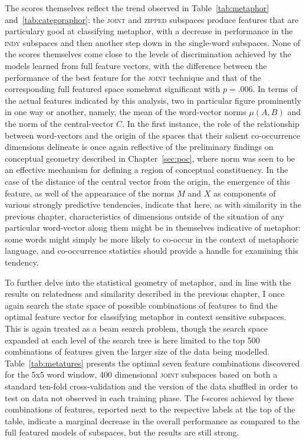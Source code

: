 The scores themselves reflect the trend observed in Table~\ref{tab:metaphor} and~\ref{tab:categoraphor}: the \textsc{joint} and \textsc{zipped} subspaces produce features that are particulary good at classifying metaphor, with a decrease in performance in the \textsc{indy} subspaces and then another step down in the single-word subspaces.  None of the scores themselves come close to the levels of discrimination achieved by the models learned from full feature vectors, with the difference between the performance of the best feature for the \textsc{joint} technique and that of the corresponding full featured space somehwat significant with $p = .006$.  In terms of the actual features indicated by this analysis, two in particular figure prominently in one way or another, namely, the mean of the word-vector norms $\mu(A,B)$ and the norm of the central-vector $C$.  In the first instance, the role of the relationship between word-vectors and the origin of the spaces that their salient co-occurrence dimensions delineate is once again reflective of the preliminary findings on conceptual geometry described in Chapter~\ref{sec:poc}, where norm was seen to be an effective mechanism for defining a region of conceptual constituency.  In the case of the distance of the central vector from the origin, the emergence of this feature, as well of the appearance of the norms $M$ and $X$ as components of various strongly predictive tendencies, indicate that here, as with similarity in the previous chapter, characteristics of dimensions outside of the situation of any particular word-vector along them might be in themselves indicative of metaphor: some words might simply be more likely to co-occur in the context of metaphoric language, and co-occurrence statistics should provide a handle for examining this tendency.

To further delve into the statistical geometry of metaphor, and in line with the results on relatedness and similarity described in the previous chapter, I once again search the state space of possible combinations of features to find the optimal feature vector for classifying metaphor in context sensitive subspaces.  This is again treated as a beam search problem, though the search space expanded at each level of the search tree is here limited to the top 500 combinations of features given the larger size of the data being modelled.  Table~\ref{tab:metatures} presents the optimal seven feature combinations discovered for the 5x5 word window, 400 dimensional \textsc{joint} subspaces based on both a standard ten-fold cross-validation and the version of the data shuffled in order to test on data not observed in each training phase.  The f-scores achieved by these combinations of features, reported next to the respective labels at the top of the table, indicate a marginal decrease in the overall performance as compared to the full featured models of subspaces, but the results are still strong.

